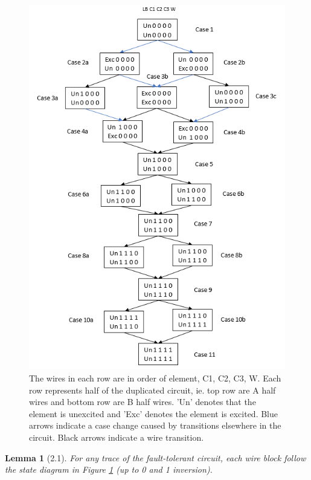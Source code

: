 \documentclass[12pt]{report}
\newtheorem*{lemma}{Lemma}
\begin{document}
\begin{figure}
  \centering
    \includegraphics{flowl2c3}
  \caption[Lemma 2 transitions]{The wires in each row are in order of element, C1, C2, C3, W.  Each row represents half of the duplicated circuit, ie. top row are A half wires and bottom row are B half wires.  'Un' denotes that the element is unexcited and 'Exc' denotes the element is excited.  Blue arrows indicate a case change caused by transitions elsewhere in the circuit.  Black arrows indicate a wire transition.}
  \label{fig:l21}
\end{figure}
\begin{lemma}[2.1]
For any trace of the fault-tolerant circuit, each wire block follow the state diagram in Figure \ref{fig:l21} (up to 0 and 1 inversion).
\end{lemma}
\end{document}
